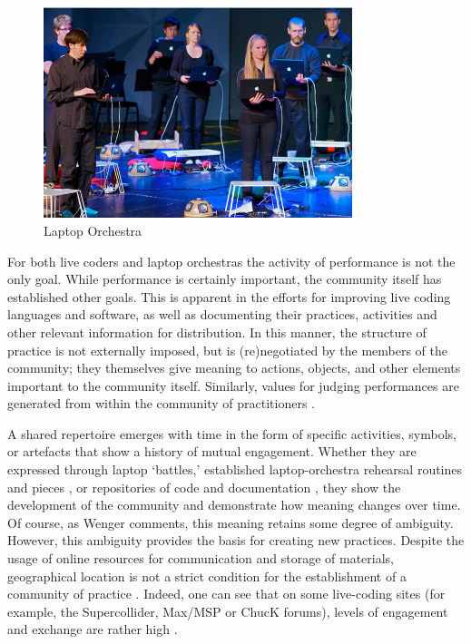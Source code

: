 \begin{figure}[t]
	\centering
		\includegraphics[width=9cm]{slork.jpg}
	\caption{Laptop Orchestra}
	\label{Marquez-Borbon:fig:lork}
\end{figure}

For both live coders and laptop orchestras the activity of performance is not the only goal. While performance is certainly important, the community itself has established other goals. This is apparent in the efforts for improving live coding languages and software, as well as documenting their practices, activities and other relevant information for distribution. In this manner, the structure of practice is not externally imposed, but is (re)negotiated by the members of the community; they themselves give meaning to actions, objects, and other elements important to the community itself. Similarly, values for judging performances are generated from within the community of practitioners \cite{Collins:2003,Magnusson:2011}. 

A shared repertoire emerges with time in the form of specific activities, symbols, or artefacts that show a history of mutual engagement. Whether they are expressed through laptop `battles,' established laptop-orchestra rehearsal routines and pieces \cite{Albert:2012}, or repositories of code and documentation \cite{Vallis:2011}, they show the development of the community and demonstrate how meaning changes over time. Of course, as Wenger \cite{Wenger:1998} comments, this meaning retains some degree of ambiguity. However, this ambiguity provides the basis for creating new practices. Despite the usage of online resources for communication and storage of materials, geographical location is not a strict condition for the establishment of a community of practice \cite{Waldron:2009,Wenger:1998}. Indeed, one can see that on some live-coding sites (for example, the Supercollider, Max/MSP or ChucK forums), levels of engagement and exchange are rather high \cite{Magnusson:2011}.     

